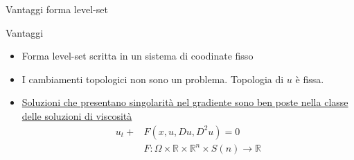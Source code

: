 \begin{frame}{Vantaggi forma level-set}
 \begin{block}{Vantaggi}
   \begin{itemize}
     \item Forma level-set scritta in un sistema di coodinate fisso
     \item I cambiamenti topologici non sono un problema. Topologia di
       $u$ è fissa.
     \item \hyperlink{jumptoend}{Soluzioni che presentano singolarità nel
       gradiente sono ben 
       poste nella classe delle soluzioni di viscosità}
       \[
       \begin{aligned}
         u_t+&F(x,u,Du,D^2u)=0 \\
         &F:\Omega\times\mathbb{R}\times\mathbb{R}^n\times
           S(n)\to\mathbb{R}\\
       \end{aligned}
           \]
   \end{itemize}
 \end{block}
\end{frame}


